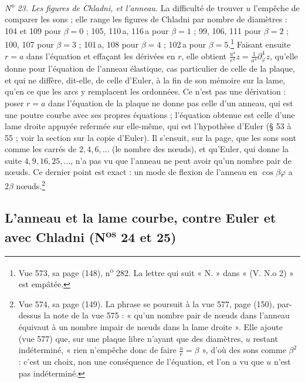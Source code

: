 \documentclass[11pt,a4paper]{article}
\begin{document}
\emph{N\textsuperscript{o} 23. Les figures de Chladni, et l'anneau.} La
difficulté de trouver $u$ l'empêche de comparer les sons ; elle range les
figures de Chladni par nombre de diamètres : 104 et 109 pour $\beta = 0$ ;
105, 110\,a, 116\,a pour $\beta = 1$ ; 99, 106, 111 pour $\beta = 2$ ; 100,
107 pour $\beta = 3$ ; 101\,a, 108 pour $\beta = 4$ ; 102\,a pour
$\beta = 5$.\footnote{Vue 573, sa page (148), n\textsuperscript{o} 282. La
lettre qui suit « N. » dans « (V. N.o 2) » est empâtée.} Faisant ensuite
$r = a$ dans l'équation et effaçant les dérivées en $r$, elle obtient
$\frac{u^4}{e^4}z = \frac{1}{a^4}\partial_\varphi^4 z$, qu'elle donne pour
l'équation de l'anneau élastique, cas particulier de celle de la plaque, et qui
ne diffère, dit-elle, de celle d'Euler, à la fin de son mémoire sur la lame, qu'en
ce que les arcs y remplacent les ordonnées. Ce n'est pas une dérivation :
poser $r = a$ dans l'équation de la plaque ne donne pas celle d'un anneau, qui
est une poutre courbe avec ses propres équations ; l'équation obtenue est celle
d'une lame droite appuyée refermée sur elle-même, qui est l'hypothèse d'Euler
(§ 53 à 55 ; voir la section sur la copie d'Euler). Il s'ensuit, sur la page, que
les sons sont comme les carrés de $2, 4, 6, \dots$ (le nombre des nœuds), et
qu'Euler, qui donne la suite $4, 9, 16, 25, \dots$, n'a pas vu que l'anneau ne
peut avoir qu'un nombre pair de nœuds. Ce dernier point est exact : un mode de
flexion de l'anneau en $\cos\beta\varphi$ a $2\beta$ nœuds.\footnote{Vue 574, sa
page (149). La phrase se poursuit à la vue 577, page (150), par-dessus la note de
la vue 575 : « qu'un nombre pair de nœuds dans l'anneau équivaut à un nombre
impair de nœuds dans la lame droite ». Elle ajoute (vue 577) que, sur une plaque
libre n'ayant que des diamètres, $u$ restant indéterminé, « rien n'empêche donc
de faire $\frac{u}{e} = \beta$ », d'où des sons comme $\beta^2$ : c'est un
choix, non une conséquence de l'équation, et l'on a vu que $u$ n'est pas
indéterminé.}

\subsection*{L'anneau et la lame courbe, contre Euler et avec Chladni (N\textsuperscript{os} 24 et 25)}
\end{document}
